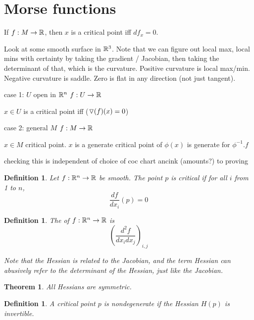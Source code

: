 \documentclass[11pt]{amsbook}
\newenvironment{dateenv}{
	\vspace{1em}
}{
	\vspace{1em}
}
\newcommand{\mydate}[4]{
	\newdate{#1}{#2}{#3}{#4}
	\begin{dateenv}
		\hfill\displaydate{#1}
	\end{dateenv}
}
\theoremstyle{mystyle} \newtheorem{thrm}[thm]{Theorem}
\theoremstyle{mystyle} \newtheorem{defi}[thm]{Definition}
\theoremstyle{mystyle} \newtheorem{coro}[thm]{Corollary}
\theoremstyle{mystyle} \newtheorem{propo}[thm]{Proposition}
\theoremstyle{mystyle} \newtheorem{lemm}[thm]{Lemma}
\numberwithin{thm}{section}
\begin{document}
\section{Morse functions}

\begin{rmk}
	If $f : M \to {\mathbb R}$, then $x$ is a critical point iff $df_x = 0$.
\end{rmk}

\begin{example}
	Look at some smooth surface in ${\mathbb R}^3$.
	Note that we can figure out local max, local mins with certainty by taking the gradient / Jacobian, then taking the determinant of that, which is the curvature.  Positive curvature is local max/min.  Negative curvature is saddle.  Zero is flat in any direction (not just tangent).

		case 1:
			$U$ open in ${\mathbb R}^n$
			$f: U \to {\mathbb R}$

			$x \in U$ is a critical point iff ($\triangledown(f)(x) = 0$)

		case 2:
			general $M$
			$f: M \to {\mathbb R}$

			$x \in M$ critical point.  $x$ is a generate critical point of $\phi(x)$ is generate for $\phi^{-1}.f$


		checking this is independent of choice of coc chart ancink (amounts?) to proving
\end{example}

\mydate{d19}{30}{11}{2016}

\begin{defi}
	Let $f : {\mathbb R}^n \to {\mathbb R}$ be smooth.  The point $p$ is \emph{critical} if for all $i$ from 1 to $n$, $$\frac{df}{dx_i}(p) = 0$$
\end{defi}

\begin{defi}
	The  of $f: {\mathbb R}^n \to {\mathbb R}$ is $$\left( \frac{d^2f}{dx_i dx_j} \right)_{i,j}$$

	Note that the Hessian is related to the Jacobian, and the term Hessian can abusively refer to the determinant of the Hessian, just like the Jacobian.
\end{defi}
\begin{thrm}
	All Hessians are symmetric.
\end{thrm}

\begin{defi}
	A critical point $p$ is \emph{nondegenerate} if the Hessian $H(p)$ is invertible.
\end{defi}
\end{document}
